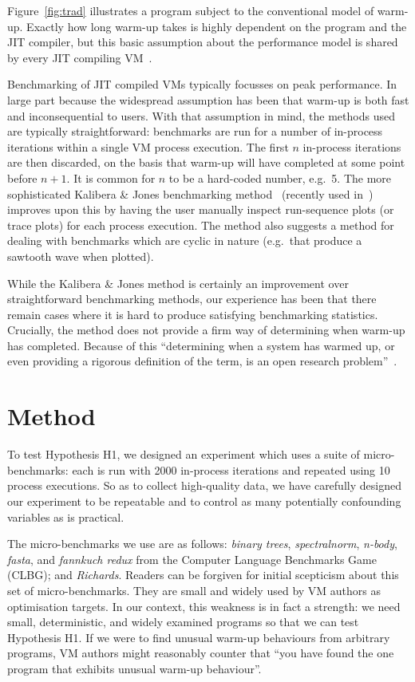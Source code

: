 \documentclass[preprint]{sigplanconf}
\newcommand{\kalibera}{Kalibera \& Jones\xspace}
\newcommand{\hypone}{H1\xspace}
\newcommand{\binarytrees}{\emph{binary trees}\xspace}
\newcommand{\richards}{\emph{Richards}\xspace}
\newcommand{\spectralnorm}{\emph{spectralnorm}\xspace}
\newcommand{\nbody}{\emph{n-body}\xspace}
\newcommand{\fasta}{\emph{fasta}\xspace}
\newcommand{\fannkuch}{\emph{fannkuch redux}\xspace}
\begin{document}
Figure~\ref{fig:trad} illustrates a
program subject to the conventional model of warm-up. Exactly how long warm-up
takes is highly dependent on
the program and the JIT compiler, but this basic assumption about the
performance model is shared by every JIT compiling
VM~\cite{kalibera13rigorous}.

Benchmarking of JIT compiled VMs typically focusses on peak
performance. In large part because the widespread assumption has been that
warm-up is both fast and inconsequential to users. With that assumption in mind, the
methods used are typically straightforward: benchmarks are run for a number
of in-process iterations within a single VM process execution.
The first $n$ in-process iterations are then discarded, on the basis that warm-up
will have completed at some point before $n+1$. It is common for
$n$ to be a hard-coded number, e.g.~5. 
The more sophisticated \kalibera
benchmarking method~\cite{kalibera12quantifying,kalibera13rigorous}
(recently used in~\cite{barrett15approaches,grimmer15dynamically}) improves
upon this by having the user manually inspect run-sequence plots (or trace
plots) for each process execution. The method also suggests a method for
dealing with benchmarks which are cyclic in nature (e.g.~that produce a
sawtooth wave when plotted).

While the \kalibera method is certainly an improvement over
straightforward benchmarking methods,
our experience has been that there remain cases where it is hard to produce
satisfying benchmarking statistics. Crucially, the method does not
provide a firm way of determining when warm-up has completed. Because of this
``determining when a system has warmed up, or even providing a
rigorous definition of the term, is an open research problem''~\cite{seaton15phd}.

\section{Method}
\label{sec:method}

To test Hypothesis \hypone, we designed an experiment which uses a suite of
micro-benchmarks: each is run with 2000 in-process iterations and repeated
using 10 process executions. So as
to collect high-quality data, we have carefully designed our
experiment to be repeatable and to control as many potentially confounding variables as
is practical.

The micro-benchmarks we use are as follows: \binarytrees, \spectralnorm, \nbody,
\fasta, and \fannkuch from the Computer Language Benchmarks Game (CLBG); and
\richards. Readers can be forgiven for initial scepticism about this set of micro-benchmarks.
They are small and widely
used by VM authors as optimisation targets.
In our context, this weakness is in fact a strength: we need
small, deterministic, and widely examined programs so that we can test
Hypothesis \hypone. If we were to find unusual warm-up behaviours from arbitrary programs,
VM authors might reasonably counter that
``you have found the one program that exhibits unusual warm-up behaviour''.
\end{document}
